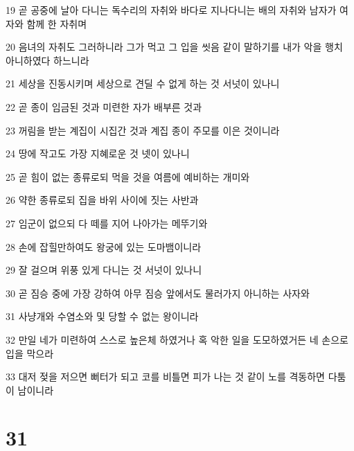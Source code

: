\par 19 곧 공중에 날아 다니는 독수리의 자취와 바다로 지나다니는 배의 자취와 남자가 여자와 함께 한 자취며
\par 20 음녀의 자취도 그러하니라 그가 먹고 그 입을 씻음 같이 말하기를 내가 악을 행치 아니하였다 하느니라
\par 21 세상을 진동시키며 세상으로 견딜 수 없게 하는 것 서넛이 있나니
\par 22 곧 종이 임금된 것과 미련한 자가 배부른 것과
\par 23 꺼림을 받는 계집이 시집간 것과 계집 종이 주모를 이은 것이니라
\par 24 땅에 작고도 가장 지혜로운 것 넷이 있나니
\par 25 곧 힘이 없는 종류로되 먹을 것을 여름에 예비하는 개미와
\par 26 약한 종류로되 집을 바위 사이에 짓는 사반과
\par 27 임군이 없으되 다 떼를 지어 나아가는 메뚜기와
\par 28 손에 잡힐만하여도 왕궁에 있는 도마뱀이니라
\par 29 잘 걸으며 위풍 있게 다니는 것 서넛이 있나니
\par 30 곧 짐승 중에 가장 강하여 아무 짐승 앞에서도 물러가지 아니하는 사자와
\par 31 사냥개와 수염소와 및 당할 수 없는 왕이니라
\par 32 만일 네가 미련하여 스스로 높은체 하였거나 혹 악한 일을 도모하였거든 네 손으로 입을 막으라
\par 33 대저 젖을 저으면 뻐터가 되고 코를 비틀면 피가 나는 것 같이 노를 격동하면 다툼이 남이니라

\chapter{31}

